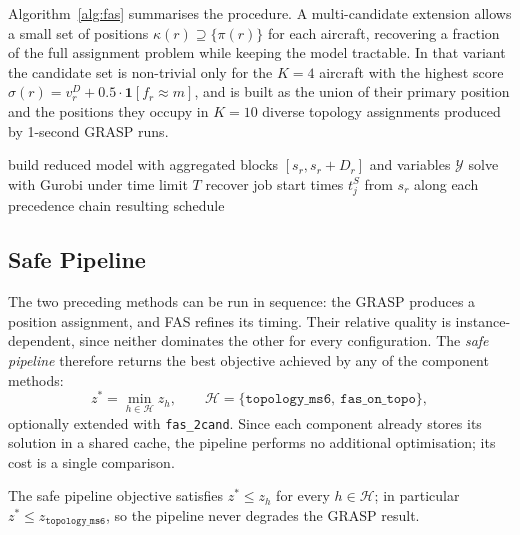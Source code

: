 Algorithm~\ref{alg:fas} summarises the procedure.  A multi-candidate
extension allows a small set of positions $\kappa(r) \supseteq \{\pi(r)\}$
for each aircraft, recovering a fraction of the full assignment problem
while keeping the model tractable.  In that variant the candidate set is
non-trivial only for the $K = 4$ aircraft with the highest score
$\sigma(r) = v^D_r + 0.5 \cdot \mathbf{1}[f_r \approx m]$, and is built as
the union of their primary position and the positions they occupy in
$K = 10$ diverse topology assignments produced by 1-second GRASP runs.

\begin{algorithm}[htbp]
\DontPrintSemicolon
{}
build reduced model with aggregated blocks $[s_r, s_r + D_r]$
       and variables $\mathcal{Y}$\;
solve with Gurobi under time limit $T$\;
recover job start times $t^S_j$ from $s_r$ along each precedence chain\;
\Return resulting schedule\;
\caption{Fixed-Assignment Scheduler (FAS) with optional multi-candidate.}
\label{alg:fas}
\end{algorithm}

\subsection{Safe Pipeline}
\label{sec:safe_pipeline}

The two preceding methods can be run in sequence: the GRASP produces a
position assignment, and FAS refines its timing.  Their relative quality
is instance-dependent, since neither dominates the other for every
configuration.  The \emph{safe pipeline} therefore returns the best
objective achieved by any of the component methods:
\[
  z^* = \min_{h \in \mathcal{H}} z_h,
  \qquad \mathcal{H} = \{\texttt{topology\_ms6},\ \texttt{fas\_on\_topo}\},
\]
optionally extended with \texttt{fas\_2cand}.  Since each component
already stores its solution in a shared cache, the pipeline performs no
additional optimisation; its cost is a single comparison.

\begin{proposition}
The safe pipeline objective satisfies $z^* \le z_h$ for every
$h \in \mathcal{H}$; in particular $z^* \le z_{\texttt{topology\_ms6}}$,
so the pipeline never degrades the GRASP result.
\end{proposition}
